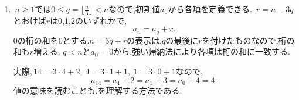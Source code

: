     \noindent {}\par\nobreak
    \begin{enumerate}[label=(\arabic*),parsep=3pt,beginpenalty=10000,format=\bookitemlink{example-gauss-role-8}{solution}{problem}]
      \item \,$n\ge1$では$0\le q=\lfloor\frac n3\rfloor<n$なので,初期値$a_0$から各項を定義できる.
            \,$r=n-3q$とおけば$r$は0,1,2のいずれかで,
            \[
              a_n=a_q+r.
            \]
            0の桁の和を0とする.$n=3q+r$の表示は,$q$の最後に$r$を付けたものなので,桁の和も$r$増える.
            $q<n$と$a_0=0$から,強い帰納法により各項は桁の和に一致する.

            実際,\,$14=3\cdot4+2,\ 4=3\cdot1+1,\ 1=3\cdot0+1$なので,
            \[
              a_{14}=a_4+2=a_1+3=a_0+4=4.
            \]
            値の意味を読むことも,を理解する方法である.
    \end{enumerate}
